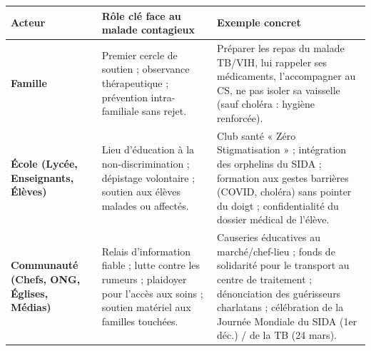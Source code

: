 \documentclass[11pt]{article}
\begin{document}
\begin{center}
\begin{tabularx}{\linewidth}{|l|X|X|}
\hline
\rowcolor{popblueL}
\textbf{Acteur} & \textbf{Rôle clé face au malade contagieux} & \textbf{Exemple concret} \\
\hline
\textbf{Famille} & Premier cercle de soutien ; observance thérapeutique ; prévention intra-familiale sans rejet. & Préparer les repas du malade TB/VIH, lui rappeler ses médicaments, l'accompagner au CS, ne pas isoler sa vaisselle (sauf choléra : hygiène renforcée). \\
\hline
\textbf{École (Lycée, Enseignants, Élèves)} & Lieu d'éducation à la non-discrimination ; dépistage volontaire ; soutien aux élèves malades ou affectés. & Club santé « Zéro Stigmatisation » ; intégration des orphelins du SIDA ; formation aux gestes barrières (COVID, choléra) sans pointer du doigt ; confidentialité du dossier médical de l'élève. \\
\hline
\textbf{Communauté (Chefs, ONG, Églises, Médias)} & Relais d'information fiable ; lutte contre les rumeurs ; plaidoyer pour l'accès aux soins ; soutien matériel aux familles touchées. & Causeries éducatives au marché/chef-lieu ; fonds de solidarité pour le transport au centre de traitement ; dénonciation des guérisseurs charlatans ; célébration de la Journée Mondiale du SIDA (1er déc.) / de la TB (24 mars). \\
\hline
\end{tabularx}
\end{center}
\end{document}
